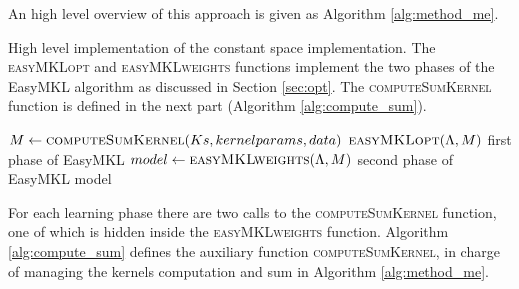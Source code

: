 An high level overview of this approach is given as Algorithm \ref{alg:method_me}.
\begin{algorithm}
    \caption{
        High level implementation of the constant space implementation.
        The \textsc{easyMKLopt} and \textsc{easyMKLweights} functions implement
        the two phases of the EasyMKL algorithm as discussed in Section \ref{sec:opt}.
        The \textsc{computeSumKernel} function is defined in the next part
        (Algorithm \ref{alg:compute_sum}).
    }

    \label{alg:method_me}
    \begin{algorithmic}[1]
                    \State $M \gets \Call{computeSumKernel}{Ks,kernelparams,data}$
                    \State $\Call{easyMKLopt}{\Lambda,M}$
                    \Comment first phase of EasyMKL
                    \State $model \gets \Call{easyMKLweights}{\Lambda,M}$
                    \Comment second phase of EasyMKL
                    \State \Return model
%            

    \end{algorithmic}
\end{algorithm}

For each learning phase there are two calls to the \textsc{computeSumKernel}
function, one of which is hidden inside the \textsc{easyMKLweights} function.
Algorithm \ref{alg:compute_sum} defines the auxiliary function \textsc{computeSumKernel},
in charge of managing the kernels computation and sum in Algorithm \ref{alg:method_me}.

